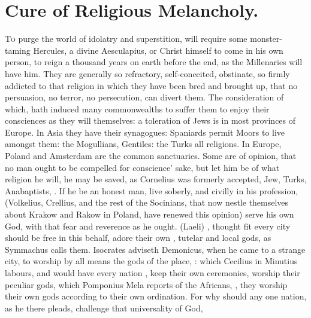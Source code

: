 {%
\section{Cure of Religious Melancholy.}

\lettrine{T}{o} purge the world of idolatry and superstition, will require some
monster-taming Hercules, a divine Aesculapius, or Christ himself to
come in his own person, to reign a thousand years on earth before the
end, as the Millenaries will have him. They are generally so
refractory, self-conceited, obstinate, so firmly addicted to that
religion in which they have been bred and brought up, that no
persuasion, no terror, no persecution, can divert them. The
consideration of which, hath induced many commonwealths to suffer them
to enjoy their consciences as they will themselves: a toleration of
Jews is in most provinces of Europe. In Asia they have their
synagogues: Spaniards permit Moors to live amongst them: the
Mogullians, Gentiles: the Turks all religions. In Europe, Poland and
Amsterdam are the common sanctuaries. Some are of opinion, that no man
ought to be compelled for conscience' sake, but let him be of what
religion he will, he may be saved, as Cornelius was formerly accepted,
Jew, Turks, Anabaptists, \etc{}. If he be an honest man, live soberly, and
civilly in his profession, (Volkelius, Crellius, and the rest of the
Socinians, that now nestle themselves about Krakow and Rakow in Poland,
have renewed this opinion) serve his own God, with that fear and
reverence as he ought.  (Laeli) , \Tully thought fit every city should be free in this behalf,
adore their own , tutelar and local gods, as
Symmachus calls them. Isocrates adviseth Demonicus, when he came to a
strange city, to worship by all means the gods of the place, :
which Cecilius in Minutius labours, and would have every nation
, keep their own
ceremonies, worship their peculiar gods, which Pomponius Mela reports
of the Africans, , they worship their
own gods according to their own ordination. For why should any one
nation, as he there pleads, challenge that universality of God, }
